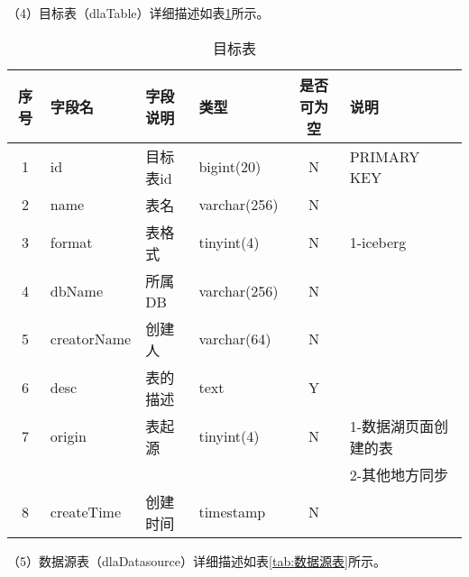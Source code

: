 （4）目标表（dlaTable）详细描述如表\ref{tab:目标表}所示。

\begin{table}[H]
  \centering
  \caption{目标表}
  \label{tab:目标表}
  \begin{tabular}{clllcl}
    \toprule
    序号  & 字段名              & 字段说明     & 类型           & 是否可为空   & 说明  \\
    \midrule
    1    & id                 & 目标表id     & bigint(20)    & N          & PRIMARY KEY    \\
    2    & name               & 表名         & varchar(256)  & N          &    \\
    3    & format             & 表格式       & tinyint(4)    & N          & 1-iceberg  \\
    4    & dbName             & 所属DB       & varchar(256)  & N          &   \\
    5    & creatorName        & 创建人       & varchar(64)   & N          &   \\
    6    & desc               & 表的描述     & text           & Y          &   \\
    7    & origin             & 表起源       & tinyint(4)    & N          & 1-数据湖页面创建的表   \\
         &                    &             &               &            & 2-其他地方同步  \\
    8   & createTime         & 创建时间     & timestamp     & N          &    \\
    \bottomrule
  \end{tabular}
\end{table}

（5）数据源表（dlaDatasource）详细描述如表\ref{tab:数据源表}所示。

